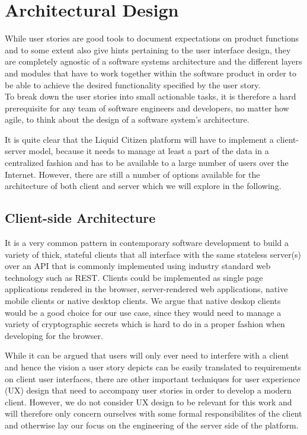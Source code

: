 \section{Architectural Design}
\label{sec:ArchitecturalDesign}

While user stories are good tools to document expectations on product functions and to some extent also give hints pertaining to the user interface design, they are completely agnostic of a software systems architecture and the different layers and modules that have to work together within the software product in order to be able to achieve the desired functionality specified by the user story.\\
To break down the user stories into small actionable tasks, it is therefore a hard prerequisite for any team of software engineers and developers, no matter how agile, to think about the design of a software system's architecture.

It is quite clear that the Liquid Citizen platform will have to implement a client-server model, because it needs to manage at least a part of the data in a centralized fashion and has to be available to a large number of users over the Internet.
However, there are still a number of options available for the architecture of both client and server which we will explore in the following.

\subsection{Client-side Architecture}
\label{ssec:ClientSideArchitecture}
It is a very common pattern in contemporary software development to build a variety of thick, stateful clients that all interface with the same stateless server(s) over an API that is commonly implemented using industry standard web technology such as REST.
Clients could be implemented as single page applications rendered in the browser, server-rendered web applications, native mobile clients or native desktop clients.
We argue that native deskop clients would be a good choice for our use case, since they would need to manage a variety of cryptographic secrets which is hard to do in a proper fashion when developing for the browser.

While it can be argued that users will only ever need to interfere with a client and hence the vision a user story depicts can be easily translated to requirements on client user interfaces, there are other important techniques for user experience (UX) design that need to accompany user stories in order to develop a modern client.
However, we do not consider UX design to be relevant for this work and will therefore only concern ourselves with some formal responsibilites of the client and otherwise lay our focus on the engineering of the server side of the platform.

